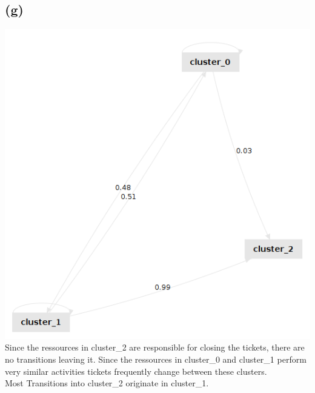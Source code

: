 \documentclass[../../main.tex]{subfiles}
\begin{document}
\subsection*{(g)}
\includegraphics[width=0.5\columnwidth]{img/RapidMiner_g_Graph.png}
Since the ressources in cluster\_2 are responsible for closing the tickets, there are no transitions leaving it. Since the ressources in cluster\_0 and cluster\_1 perform very similar activities tickets frequently change between these clusters.\\
Most Transitions into cluster\_2 originate in cluster\_1.
\end{document}

